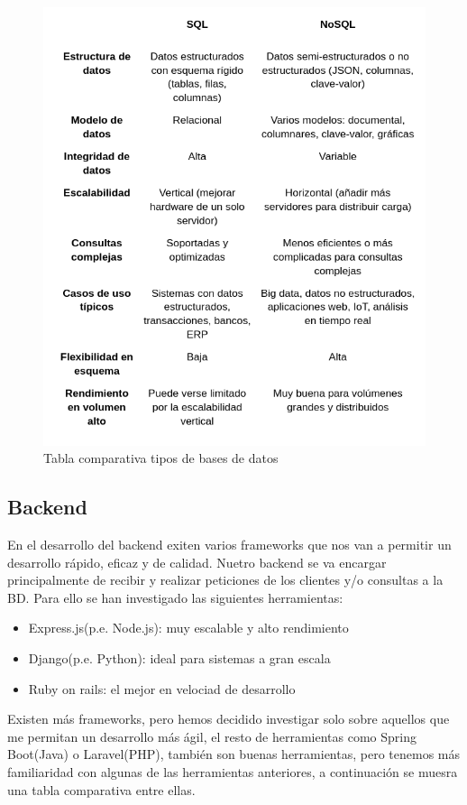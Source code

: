\begin{figure}[H]
   \centering
    \includegraphics[width=\textwidth]{tablas/BDS.png}
    \caption{Tabla comparativa tipos de bases de datos}
    \label{fig:Tabla BDS}
\end{figure} 

\subsection{Backend}
En el desarrollo del backend exiten varios frameworks que nos van a permitir un desarrollo rápido, eficaz y de calidad. Nuetro backend se va encargar principalmente de recibir y realizar peticiones de los clientes y/o consultas a la BD. Para ello se han investigado las siguientes herramientas:
\begin{itemize}
	\item Express.js(p.e. Node.js): muy escalable y alto rendimiento
	\item Django(p.e. Python): ideal para sistemas a gran escala
	\item Ruby on rails: el mejor en velociad de desarrollo
\end{itemize}
Existen más frameworks, pero hemos decidido investigar solo sobre aquellos que me permitan un desarrollo más ágil, el resto de herramientas como Spring Boot(Java) o Laravel(PHP), también son buenas herramientas, pero tenemos más familiaridad con algunas de las herramientas anteriores, a continuación se muesra una tabla comparativa entre ellas.

